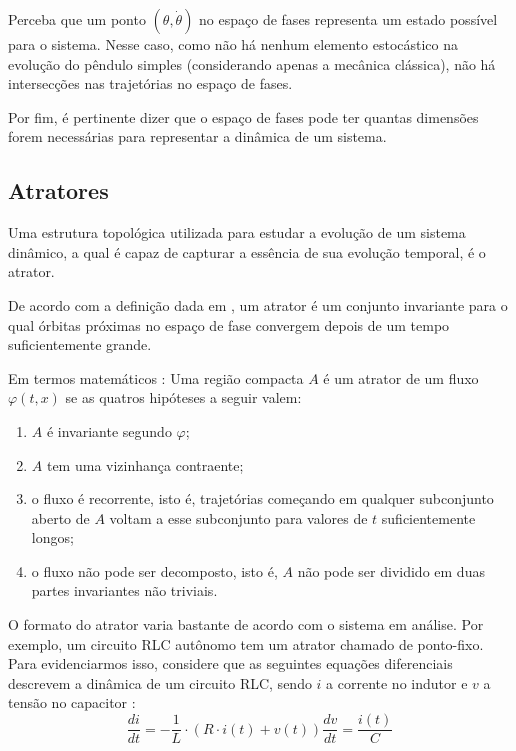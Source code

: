 \documentclass[a4paper, 12pt]{article}
\begin{document}
Perceba que um ponto $(\theta, \dot{\theta})$ no espaço de fases representa um estado possível para o sistema. Nesse caso, como não há nenhum elemento estocástico na evolução do pêndulo simples (considerando apenas a mecânica clássica), não há intersecções nas trajetórias no espaço de fases. 

Por fim, é pertinente dizer que o espaço de fases pode ter quantas dimensões forem necessárias para representar a dinâmica de um sistema. 

\subsection{Atratores}
Uma estrutura topológica utilizada para estudar a evolução de um sistema dinâmico, a  qual é capaz de capturar a essência de sua evolução temporal, é o atrator.

De acordo com a definição dada em \cite{fiedler1994caos}, um atrator é um conjunto invariante para o qual órbitas próximas no espaço de fase convergem depois de um tempo suficientemente grande.

Em termos matemáticos \cite{fiedler1994caos}: Uma região compacta $A$ é um atrator de um fluxo $\varphi(t, x)$ se as quatros hipóteses a seguir valem:
\begin{enumerate}[label=\alph*)]
	\item $A$ é invariante segundo $\varphi$;
	\item $A$ tem uma vizinhança contraente;
	\item o fluxo é recorrente, isto é, trajetórias começando em qualquer subconjunto aberto de $A$ voltam a esse subconjunto para valores de $t$ suficientemente longos;
	\item o fluxo não pode ser decomposto, isto é, $A$ não pode ser dividido em duas partes invariantes não triviais.
\end{enumerate}

O formato do atrator varia bastante de acordo com o sistema em análise. Por exemplo, um circuito RLC autônomo tem um atrator chamado de ponto-fixo. Para evidenciarmos isso, considere que as seguintes equações diferenciais descrevem a dinâmica de um circuito RLC, sendo $i$ a corrente no indutor e $v$ a tensão no capacitor \cite{attux2001dinamica}:
\begin{subequations}
\begin{equation}
\frac{di}{dt} = - \frac{1}{L} \cdot (R\cdot i(t) + v(t))
\end{equation}
\begin{equation}
\frac{dv}{dt} = \frac{i(t)}{C}
\end{equation}
\end{subequations}
\end{document}

